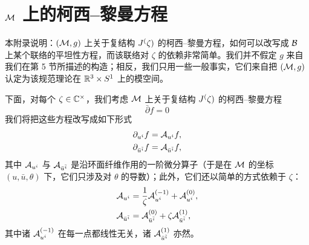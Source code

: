 \section{$\mathcal{M}$ 上的柯西--黎曼方程}
\label{app:holomorphy}

本附录说明：$(\mathcal{M},g)$ 上关于复结构 $J^(\zeta)$ 的柯西--黎曼方程，如何可以改写成 $\mathcal{B}$ 上某个联络的平坦性方程，而该联络对 $\zeta$ 的依赖非常简单。我们并不假定 $g$ 来自我们在第 5 节所描述的构造；相反，我们只用一些一般事实，它们来自把 $(\mathcal{M},g)$ 认定为该规范理论在 $\mathbb{R}^3\times S^1$ 上的模空间。%

下面，对每个 $\zeta\in\mathbb{C}^\times$，我们考虑 $\mathcal{M}$ 上关于复结构 $J^(\zeta)$ 的柯西--黎曼方程
\begin{equation} \label{eq:cauchy-riemann}
\bar\partial f = 0
\end{equation}
我们将把这些方程改写成如下形式
\begin{align}
\partial_{u^i} f &= \mathcal{A}_{u^i} f, \label{eq:cr-connection-1} \\
\partial_{\bar{u}^{\bar i}} f &= \mathcal{A}_{{\bar u}^{\bar i}} f, \label{eq:cr-connection-2}
\end{align}
其中 $\mathcal{A}_{u^i}$ 与 $\mathcal{A}_{{\bar u}^{\bar i}}$ 是沿环面纤维作用的一阶微分算子（于是在 $\mathcal{M}$ 的坐标 $(u,\bar u,\theta)$ 下，它们只涉及对 $\theta$ 的导数）；此外，它们还以简单的方式依赖于 $\zeta$：
\begin{align}
\mathcal{A}_{u^i} &= \frac{1}{\zeta} \mathcal{A}^{(-1)}_{u^i} + \mathcal{A}^{(0)}_{u^i}, \\
\mathcal{A}_{\bar u^{\bar i}} &= \mathcal{A}_{\bar u^{\bar i}}^{(0)} + \zeta \mathcal{A}_{\bar u^{\bar i}}^{(1)},
\end{align}
其中诸 $\mathcal{A}^{(-1)}_{u^i}$ 在每一点都线性无关，诸 $\mathcal{A}^{(1)}_{\bar{u}^{\bar{i}}}$ 亦然。

